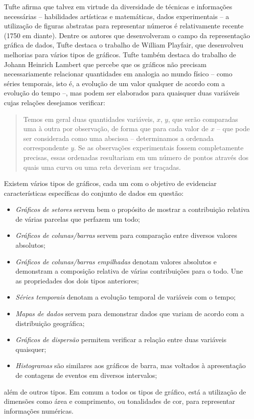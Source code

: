 Tufte afirma que talvez em virtude da diversidade de técnicas e informações necessárias -- habilidades artísticas e matemáticas, dados experimentais -- a utilização de figuras abstratas para representar números é relativamente recente (1750 em diante). Dentre os autores que desenvolveram o campo da representação gráfica de dados, Tufte destaca o trabalho de William Playfair, que desenvolveu melhorias para vários tipos de gráficos. Tufte também destaca do trabalho de Johann Heinrich Lambert  que percebe que os gráficos não precisam necessariamente relacionar quantidades em analogia ao mundo físico -- como séries temporais, isto é, a evolução de um valor qualquer de acordo com a evolução do tempo --, mas podem ser elaborados para quaisquer duas variáveis cujas relações desejamos verificar:

\begin{quote}
	Temos em geral duas quantidades variáveis, $x$, $y$, que serão comparadas uma à outra por observação, de forma que para cada valor de $x$ -- que pode ser considerada como uma abscissa -- determinamos a ordenada correspondente $y$. Se as observações experimentais fossem completamente precisas, essas ordenadas resultariam em um número de pontos através dos quais uma curva ou uma reta deveriam ser traçadas. \cite{Lambert}
\end{quote}

Existem vários tipos de gráficos, cada um com o objetivo de evidenciar características específicas do conjunto de dados em questão:
\begin{itemize}
	\item \emph{Gráficos de setores} servem bem o propósito de mostrar a contribuição relativa de várias parcelas que perfazem um todo;
	\item \emph{Gráficos de colunas/barras} servem para comparação entre diversos valores absolutos;
	\item \emph{Gráficos de colunas/barras empilhadas} denotam valores absolutos e demonstram a composição relativa de várias contribuições para o todo. Une as propriedades dos dois tipos anteriores;
	\item \emph{Séries temporais} denotam a evolução temporal de variáveis com o tempo;
	\item \emph{Mapas de dados} servem para demonstrar dados que variam de acordo com a distribuição geográfica;
	\item \emph{Gráficos de dispersão} permitem verificar a relação entre duas variáveis quaisquer;
	\item \emph{Histogramas} são similares aos gráficos de barra, mas voltados à apresentação de contagens de eventos em diversos intervalos;
\end{itemize}
%
além de outros tipos. Em comum a todos os tipos de gráfico, está a utilização de dimensões como área e comprimento, ou tonalidades de cor, para representar informações numéricas.

